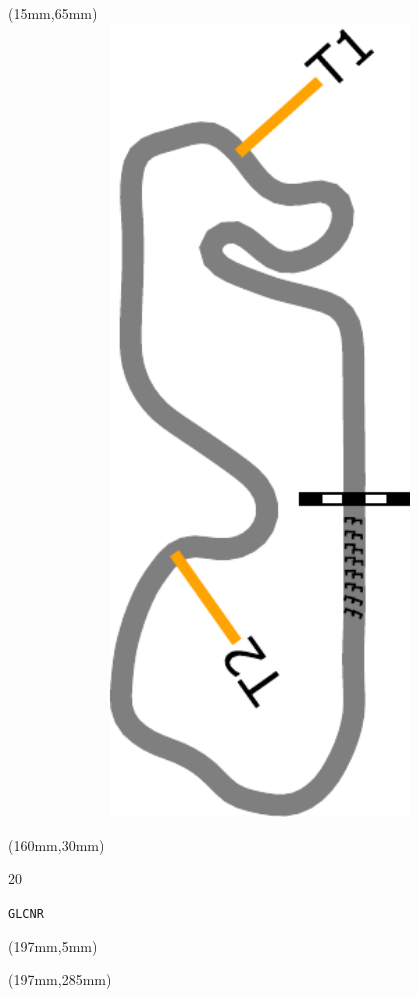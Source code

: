 \begin{textblock*}{185mm}(15mm,65mm)%
\centering
\mbox{\includegraphics[width=185mm,height=210mm,keepaspectratio]{PT/GLCNR.pdf}}
\end{textblock*}
\begin{textblock*}{40mm}(160mm,30mm)%
\Large
\par{} 
\par20 
\par\hfill\tiny\tt GLCNR\\
\end{textblock*}
\begin{textblock*}{20mm}(197mm,5mm)%
\fbox{\thepage}
\label{GLCNR}
\end{textblock*}
\begin{textblock*}{20mm}(197mm,285mm)%
\fbox{\thepage}
\end{textblock*}

